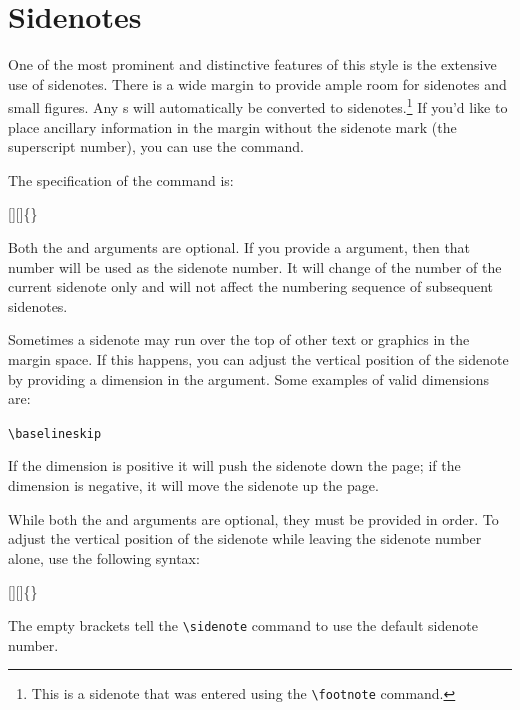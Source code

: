 \section{Sidenotes}\label{sec:sidenotes}
One of the most prominent and distinctive features of this style is the
extensive use of sidenotes.  There is a wide margin to provide ample room
for sidenotes and small figures.  Any s will automatically
be converted to sidenotes.\footnote{This is a sidenote that was entered
	using the \texttt{\textbackslash footnote} command.}  If you'd like to place ancillary
information in the margin without the sidenote mark (the superscript
number), you can use the  command.

The specification of the  command is:
\begin{docspec}
	[][]\{\}
\end{docspec}

Both the  and  arguments are optional.  If you
provide a  argument, then that number will be used as the
sidenote number.  It will change of the number of the current sidenote only and
will not affect the numbering sequence of subsequent sidenotes.

Sometimes a sidenote may run over the top of other text or graphics in the
margin space.  If this happens, you can adjust the vertical position of the
sidenote by providing a dimension in the  argument.  Some
examples of valid dimensions are:
\begin{docspec}
	\ttfamily 1.0in \qquad 2.54cm \qquad 254mm \Verb|\baselineskip|
\end{docspec}
If the dimension is positive it will push the sidenote down the page; if the
dimension is negative, it will move the sidenote up the page.

While both the  and  arguments are optional, they
must be provided in order.  To adjust the vertical position of the sidenote
while leaving the sidenote number alone, use the following syntax:
\begin{docspec}
	[][]\{\}
\end{docspec}
The empty brackets tell the \Verb|\sidenote| command to use the default
sidenote number.

